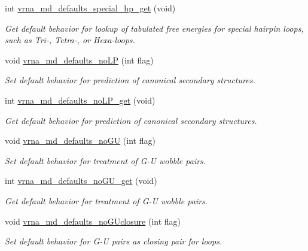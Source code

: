 \begin{DoxyCompactItemize}
int \hyperlink{group__model__details_ga1d68a6efdaa1253cc63fd9cd06452559}{vrna\+\_\+md\+\_\+defaults\+\_\+special\+\_\+hp\+\_\+get} (void)
\begin{DoxyCompactList}\small\item\em Get default behavior for lookup of tabulated free energies for special hairpin loops, such as Tri-\/, Tetra-\/, or Hexa-\/loops. \end{DoxyCompactList}\item 
void \hyperlink{group__model__details_ga2f88ffc393ac9d7987849c965fd29ea8}{vrna\+\_\+md\+\_\+defaults\+\_\+no\+L\+P} (int flag)
\begin{DoxyCompactList}\small\item\em Set default behavior for prediction of canonical secondary structures. \end{DoxyCompactList}\item 
int \hyperlink{group__model__details_ga934344888fbacaed538bbbfe910f2aa6}{vrna\+\_\+md\+\_\+defaults\+\_\+no\+L\+P\+\_\+get} (void)
\begin{DoxyCompactList}\small\item\em Get default behavior for prediction of canonical secondary structures. \end{DoxyCompactList}\item 
void \hyperlink{group__model__details_ga98218f85c7a957a1d1ddf4627fdf5a39}{vrna\+\_\+md\+\_\+defaults\+\_\+no\+G\+U} (int flag)
\begin{DoxyCompactList}\small\item\em Set default behavior for treatment of G-\/\+U wobble pairs. \end{DoxyCompactList}\item 
int \hyperlink{group__model__details_ga5faa7d4e536d7fe36ec25428c0cf2563}{vrna\+\_\+md\+\_\+defaults\+\_\+no\+G\+U\+\_\+get} (void)
\begin{DoxyCompactList}\small\item\em Get default behavior for treatment of G-\/\+U wobble pairs. \end{DoxyCompactList}\item 
void \hyperlink{group__model__details_gade5b9951d71ca2fb357a4e6c0c18ccd1}{vrna\+\_\+md\+\_\+defaults\+\_\+no\+G\+Uclosure} (int flag)
\begin{DoxyCompactList}\small\item\em Set default behavior for G-\/\+U pairs as closing pair for loops. \end{DoxyCompactList}\item 

\end{DoxyCompactItemize}
